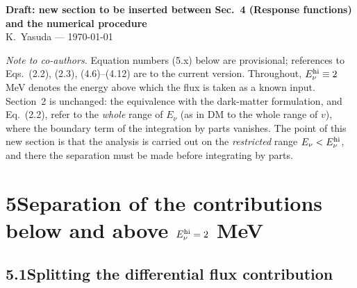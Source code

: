 \documentclass[11pt,a4paper]{article}
\newcommand{\Ev}{E_\nu}
\newcommand{\Etwo}{E_\nu^{\rm hi}}
\begin{document}
\begin{center}
{\large\bf Draft: new section to be inserted between Sec.~4 (Response functions)}\\[2pt]
{\large\bf and the numerical procedure}\\[4pt]
K.~Yasuda --- \today
\end{center}

\noindent\emph{Note to co-authors.} Equation numbers (5.x) below are provisional; references to
Eqs.~(2.2), (2.3), (4.6)--(4.12) are to the current version. Throughout,
$\Etwo\equiv2\,$MeV denotes the energy above which the flux is taken as a known input.
Section~2 is unchanged: the equivalence with the dark-matter formulation, and Eq.~(2.2),
refer to the \emph{whole} range of $\Ev$ (as in DM to the whole range of $v$), where the
boundary term of the integration by parts vanishes. The point of this new section is that
the analysis is carried out on the \emph{restricted} range $\Ev<\Etwo$, and there the
separation must be made before integrating by parts.

\section*{5\quad Separation of the contributions below and above $\Etwo=2$ MeV}

\subsection*{5.1\quad Splitting the differential flux contribution}
\end{document}
